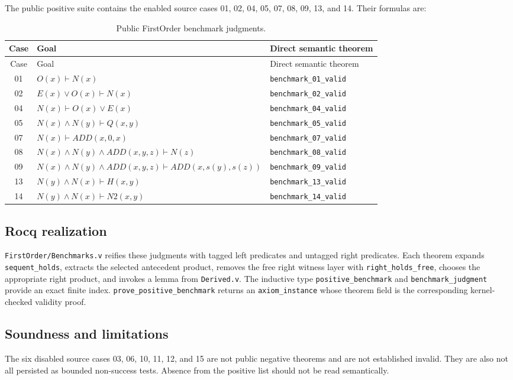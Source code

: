 \documentclass[11pt,oneside]{book}
\DeclareRobustCommand{\code}[1]{\nolinkurl{#1}}
\DeclareRobustCommand{\file}[1]{\nolinkurl{#1}}
\newcommand{\rocqreal}{\subsection*{Rocq realization}}
\newcommand{\soundlim}{\subsection*{Soundness and limitations}}
\begin{document}
The public positive suite contains the enabled source cases 01, 02, 04, 05,
07, 08, 09, 13, and 14.  Their formulas are:
\begin{longtable}{@{}cll@{}}
\caption{Public FirstOrder benchmark judgments.}
\label{tab:benchmarks}\\
\toprule
Case & Goal & Direct semantic theorem\\
\midrule
\endfirsthead
\toprule
Case & Goal & Direct semantic theorem\\
\midrule
\endhead
01 & \(O(x)\vdash N(x)\) & \code{benchmark_01_valid}\\
02 & \(E(x)\lor O(x)\vdash N(x)\) & \code{benchmark_02_valid}\\
04 & \(N(x)\vdash O(x)\lor E(x)\) & \code{benchmark_04_valid}\\
05 & \(N(x)\land N(y)\vdash Q(x,y)\) & \code{benchmark_05_valid}\\
07 & \(N(x)\vdash ADD(x,0,x)\) & \code{benchmark_07_valid}\\
08 & \(N(x)\land N(y)\land ADD(x,y,z)\vdash N(z)\) & \code{benchmark_08_valid}\\
09 & \(N(x)\land N(y)\land ADD(x,y,z)\vdash ADD(x,s(y),s(z))\) & \code{benchmark_09_valid}\\
13 & \(N(y)\land N(x)\vdash H(x,y)\) & \code{benchmark_13_valid}\\
14 & \(N(y)\land N(x)\vdash N2(x,y)\) & \code{benchmark_14_valid}\\
\bottomrule
\end{longtable}

\rocqreal

\file{FirstOrder/Benchmarks.v} reifies these judgments with tagged left
predicates and untagged right predicates.  Each theorem expands
\code{sequent_holds}, extracts the selected antecedent product, removes the
free right witness layer with \code{right_holds_free}, chooses the appropriate
right product, and invokes a lemma from \file{Derived.v}.  The inductive type
\code{positive_benchmark} and \code{benchmark_judgment} provide an exact finite
index.  \code{prove_positive_benchmark} returns an \code{axiom_instance} whose
theorem field is the corresponding kernel-checked validity proof.

\soundlim

The six disabled source cases 03, 06, 10, 11, 12, and 15 are not public
negative theorems and are not established invalid.  They are also not all
persisted as bounded non-success tests.  Absence from the positive list should
not be read semantically.
\end{document}
